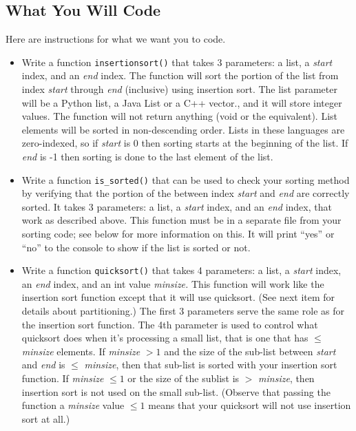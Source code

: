 \documentclass[11pt]{article}
\begin{document}
\subsection*{What You Will Code}
Here are instructions for what we want you to code.
\begin{itemize}

	\item Write a function {\tt insertionsort()} that takes 3 parameters: a list, a {\em start\/} index, and an {\em end\/} index. The function will sort the portion of the list from index {\em start\/} through {\em end\/} (inclusive) using insertion sort.  The list parameter will be a Python list, a Java List or a C++ vector., and it will store integer values. The function will not return anything (void or the equivalent). List elements will be sorted in non-descending order.  Lists in these languages are zero-indexed, so if {\em start\/} is 0 then sorting starts at the beginning of the list.  If {\em end\/} is -1 then sorting is done to the last element of the list.

	\item Write a function {\tt is\_sorted()} that can be used to check your sorting method by verifying that the portion of the between index {\em start\/} and {\em end\/} are correctly sorted.   It takes 3 parameters: a list, a {\em start\/} index, and an {\em end\/} index, that work as described above.  This function must be in a separate file from your sorting code; see below for more information on this.  It will print ``yes'' or ``no'' to the console to show if the list is sorted or not.

	\item Write a function {\tt quicksort()} that takes 4 parameters: a list, a {\em start\/} index, an {\em end\/} index, and an int value {\em minsize.}  This function will work like the insertion sort function except that it will use quicksort. (See next item for details about partitioning.)  The first 3 parameters serve the same role as for the insertion sort function.  The 4th parameter is used to control what quicksort does when it's processing a small list, that is one that has $\leq$ {\em minsize} elements.  If {\em minsize} $> 1$ and the size of the sub-list between {\em start\/} and {\em end\/} is $\leq$ {\em minsize}, then that sub-list is sorted with your insertion sort function.  If {\em minsize} $\leq 1$ or the size of the sublist is $>$ {\em minsize}, then insertion sort is not used on the small sub-list.  (Observe that passing the function a {\em minsize} value $\leq 1$ means that your quicksort will not use insertion sort at all.)
	

\end{itemize}
\end{document}
